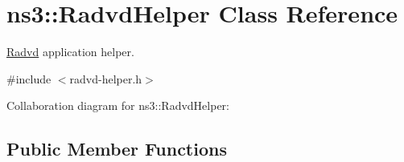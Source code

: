 \hypertarget{classns3_1_1RadvdHelper}{}\section{ns3\+:\+:Radvd\+Helper Class Reference}
\label{classns3_1_1RadvdHelper}


\hyperlink{classns3_1_1Radvd}{Radvd} application helper.  




{\ttfamily \#include $<$radvd-\/helper.\+h$>$}



Collaboration diagram for ns3\+:\+:Radvd\+Helper\+:
\subsection*{Public Member Functions}
